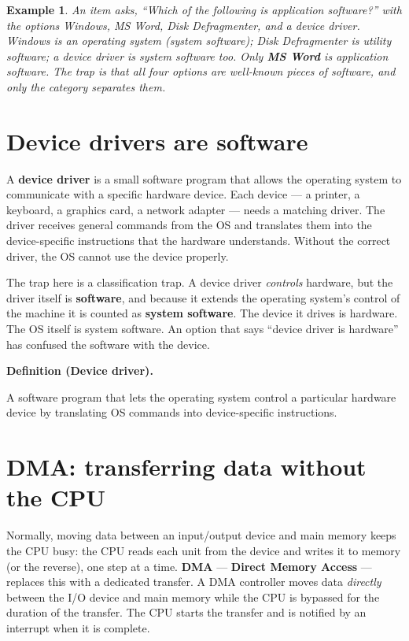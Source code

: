 \documentclass[11pt]{article}
\newtheorem{example}{Example}[section]
\newenvironment{definitionbox}[1]{%
  \par\noindent\textbf{Definition (#1).}\ \itshape
}{\par\vspace{0.3em}}
\begin{document}
\begin{example}
An item asks, ``Which of the following is application software?'' with the
options Windows, MS Word, Disk Defragmenter, and a device driver. Windows is
an operating system (system software); Disk Defragmenter is utility software;
a device driver is system software too. Only \textbf{MS Word} is application
software. The trap is that all four options are well-known pieces of
software, and only the \emph{category} separates them.
\end{example}

\section{Device drivers are software}
A \textbf{device driver} is a small software program that allows the
operating system to communicate with a specific hardware device. Each device
--- a printer, a keyboard, a graphics card, a network adapter --- needs a
matching driver. The driver receives general commands from the OS and
translates them into the device-specific instructions that the hardware
understands. Without the correct driver, the OS cannot use the device
properly.

The trap here is a classification trap. A device driver \emph{controls}
hardware, but the driver itself is \textbf{software}, and because it extends
the operating system's control of the machine it is counted as \textbf{system
software}. The device it drives is hardware. The OS itself is system
software. An option that says ``device driver is hardware'' has confused the
software with the device.

\begin{definitionbox}{Device driver}
A software program that lets the operating system control a particular
hardware device by translating OS commands into device-specific
instructions.
\end{definitionbox}

\section{DMA: transferring data without the CPU}
Normally, moving data between an input/output device and main memory keeps
the CPU busy: the CPU reads each unit from the device and writes it to memory
(or the reverse), one step at a time. \textbf{DMA} --- \textbf{Direct Memory
Access} --- replaces this with a dedicated transfer. A DMA controller moves
data \emph{directly} between the I/O device and main memory while the CPU is
bypassed for the duration of the transfer. The CPU starts the transfer and is
notified by an interrupt when it is complete.
\end{document}
